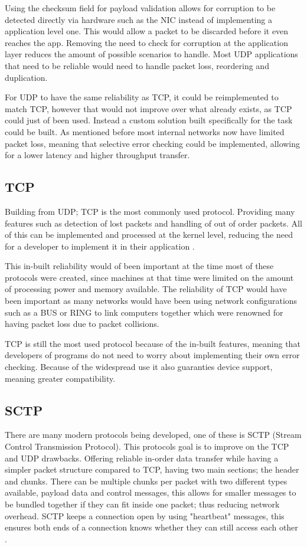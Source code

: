 Using the checksum field for payload validation allows for corruption to be detected directly via hardware such as the NIC instead of implementing a application level one. This would allow a packet to be discarded before it even reaches the app. Removing the need to check for corruption at the application layer reduces the amount of possible scenarios to handle. Most UDP applications that need to be reliable would need to handle packet loss, reordering and duplication.

For UDP to have the same reliability as TCP, it could be reimplemented to match TCP, however that would not improve over what already exists, as TCP could just of been used. Instead a custom solution built specifically for the task could be built. As mentioned before most internal networks now have limited packet loss, meaning that selective error checking could be implemented, allowing for a lower latency and higher throughput transfer.

\subsection*{TCP}
Building from UDP; TCP is the most commonly used protocol. Providing many features such as detection of lost packets and handling of out of order packets. All of this can be implemented and processed at the kernel level, reducing the need for a developer to implement it in their application \parencite{tcp-rfc793}.

This in-built reliability would of been important at the time most of these protocols were created, since machines at that time were limited on the amount of processing power and memory available. The reliability of TCP would have been important as many networks would have been using network configurations such as a BUS or RING to link computers together which were renowned for having packet loss due to packet collisions.

TCP is still the most used protocol because of the in-built features, meaning that developers of programs do not need to worry about implementing their own error checking. Because of the widespread use it also guaranties device support, meaning greater compatibility.

\subsection*{SCTP}
There are many modern protocols being developed, one of these is SCTP (Stream Control Transmission Protocol). This protocols goal is to improve on the TCP and UDP drawbacks. Offering reliable in-order data transfer while having a simpler packet structure compared to TCP, having two main sections; the header and chunks. There can be multiple chunks per packet with two different types available, payload data and control messages, this allows for smaller messages to be bundled together if they can fit inside one packet; thus reducing network overhead. SCTP keeps a connection open by using "heartbeat" messages, this ensures both ends of a connection knows whether they can still access each other \parencite{sctp-rfc9260}.

